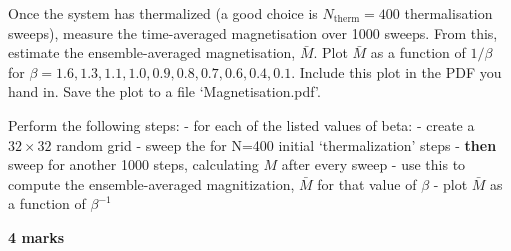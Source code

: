 \documentclass[11pt]{article}
\begin{document}
Once the system has thermalized (a good choice is
\(N_\mathrm{therm} =400\) thermalisation sweeps), measure the
time-averaged magnetisation over 1000 sweeps. From this, estimate the
ensemble-averaged magnetisation, \(\bar M\). Plot \(\bar M\) as a
function of \(1/\beta\) for
\(\beta = 1.6, 1.3, 1.1, 1.0, 0.9, 0.8, 0.7, 0.6, 0.4, 0.1\). Include
this plot in the PDF you hand in. Save the plot to a file
`Magnetisation.pdf'.

Perform the following steps: - for each of the listed values of beta: -
create a \(32\times32\) random grid - sweep the for N=400 initial
`thermalization' steps - \textbf{then} sweep for another 1000 steps,
calculating \(M\) after every sweep - use this to compute the
ensemble-averaged magnitization, \(\bar M\) for that value of \(\beta\)
- plot \(\bar M\) as a function of \(\beta^{-1}\)

\textbf{4 marks}
\end{document}
